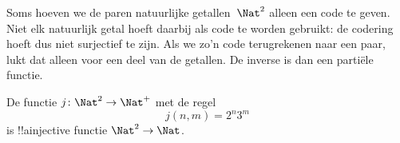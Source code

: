 \documentclass[../../../include/open-logic-section]{subfiles}
\begin{document}
Soms hoeven we de paren natuurlijke getallen~$\Nat^2$ alleen een code te geven.
Niet elk natuurlijk getal hoeft daarbij als code te worden gebruikt: de
codering hoeft dus niet surjectief te zijn. Als we zo'n code terugrekenen naar
een paar, lukt dat alleen voor een deel van de getallen. De inverse is dan een
partiële functie.

\begin{ex}
De functie $j\colon \Nat^2 \to \Nat^+$ met de regel
\[
j(n,m) = 2^n3^m
\]
is !!a{injective} functie $\Nat^2 \to \Nat$.
\end{ex}
\end{document}
